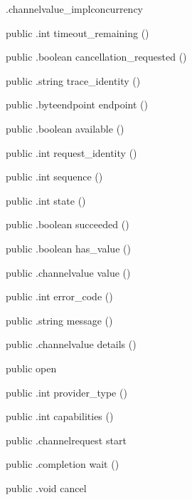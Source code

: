 \begin{CrexxClass}{.channelvalue\_impl}{concurrency}
\begin{Members}
    \Method
      {public}
      {.int}
      {timeout\_remaining}
      {()}

    \Method
      {public}
      {.boolean}
      {cancellation\_requested}
      {()}

    \Method
      {public}
      {.string}
      {trace\_identity}
      {()}

    \Method
      {public}
      {.byteendpoint}
      {endpoint}
      {()}

    \Method
      {public}
      {.boolean}
      {available}
      {()}

    \Method
      {public}
      {.int}
      {request\_identity}
      {()}

    \Method
      {public}
      {.int}
      {sequence}
      {()}

    \Method
      {public}
      {.int}
      {state}
      {()}

    \Method
      {public}
      {.boolean}
      {succeeded}
      {()}

    \Method
      {public}
      {.boolean}
      {has\_value}
      {()}

    \Method
      {public}
      {.channelvalue}
      {value}
      {()}

    \Method
      {public}
      {.int}
      {error\_code}
      {()}

    \Method
      {public}
      {.string}
      {message}
      {()}

    \Method
      {public}
      {.channelvalue}
      {details}
      {()}

    \Factory
      {public}
      {open}
      {}

    \Method
      {public}
      {.int}
      {provider\_type}
      {()}

    \Method
      {public}
      {.int}
      {capabilities}
      {()}

    \Method
      {public}
      {.channelrequest}
      {start}
      {}

    \Method
      {public}
      {.completion}
      {wait}
      {()}

    \Method
      {public}
      {.void}
      {cancel}
      {}


\end{Members}
\end{CrexxClass}

